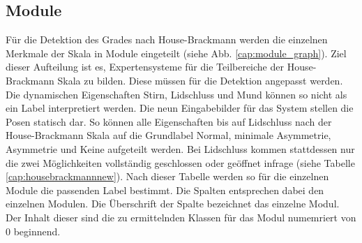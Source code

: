 \subsection{Module}\label{module} %
Für die Detektion des Grades nach House-Brackmann werden die einzelnen Merkmale der Skala in Module eingeteilt (siehe Abb. \ref{cap:module_graph}). Ziel dieser Aufteilung ist es, Expertensysteme für die Teilbereiche der House-Brackmann Skala zu bilden. Diese müssen für die Detektion angepasst werden. Die dynamischen Eigenschaften Stirn, Lidschluss und Mund können so nicht als ein Label interpretiert werden. Die neun Eingabebilder für das System stellen die Posen statisch dar. So können alle Eigenschaften bis auf Lidschluss nach der House-Brackmann Skala auf die Grundlabel \glqq Normal\grqq{}, \glqq minimale Asymmetrie\grqq{}, \glqq Asymmetrie\grqq{} und \glqq Keine\grqq{} aufgeteilt werden. Bei Lidschluss kommen stattdessen nur die zwei Möglichkeiten \glqq vollständig geschlossen\grqq{} oder \glqq geöffnet\grqq{} infrage (siehe Tabelle \ref{cap:housebrackmannnew}).
Nach dieser Tabelle werden so für die einzelnen Module die passenden Label bestimmt. Die Spalten entsprechen dabei den einzelnen Modulen. Die Überschrift der Spalte bezeichnet das einzelne Modul. Der Inhalt dieser sind die zu ermittelnden Klassen für das Modul numemriert von 0 beginnend.

